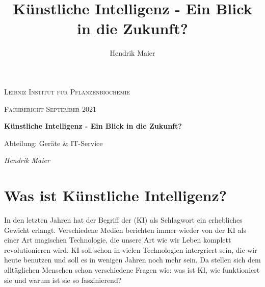 \documentclass[12pt,german,ngerman]{report}
\title{Künstliche Intelligenz - Ein Blick in die Zukunft?}
\author{Hendrik Maier}
\date{}
\begin{document}
    \begin{titlepage}
        \centering
        {\scshape\LARGE Leibniz Institut für Pflanzenbiochemie\par}
        \vspace{1cm}
        {\scshape\Large Fachbericht September 2021\par}
        \vspace{1.5cm}
        {\huge\bfseries Künstliche Intelligenz - Ein Blick in die Zukunft?\par}
        \vspace{2cm}
        {\Large Abteilung: Geräte \& IT-Service\par}
        \vspace{1.5cm}
        {\Large\itshape Hendrik Maier\par}
        \vfill

    \end{titlepage}

    \tableofcontents
    \newpage

    \chapter{Was ist Künstliche Intelligenz?}
    In den letzten Jahren hat der Begriff der  (KI) als Schlagwort ein erhebliches Gewicht
    erlangt. Verschiedene Medien berichten immer wieder von der KI als einer Art magischen Technologie, die unsere
    Art wie wir Leben komplett revolutionieren wird. KI soll schon in vielen Technologien intergriert sein, die wir heute
    benutzen und soll es in wenigen Jahren noch mehr sein. Da stellen sich dem alltäglichen Menschen schon
    verschiedene Fragen wie: was ist KI, wie funktioniert sie und warum ist sie so faszinierend?
\end{document}
